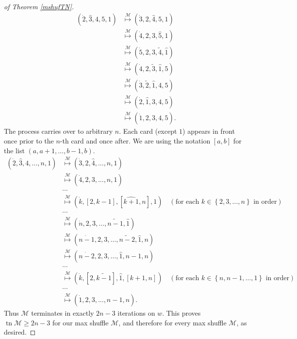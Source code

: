 \documentclass[final,nomarks]{dmtcs-episciences}
\theoremstyle{definition}
\theoremstyle{definition}
\theoremstyle{remark}
\newcommand{\M}{\mathcal{M}} %
\newcommand{\tn}{\operatorname{tn }} %
\newcommand{\tup}[1]{\left( #1 \right)}
\newcommand{\set}[1]{\left\{ #1 \right\}}
\begin{document}
\begin{proof}[of Theorem \ref{mshufTN}]
\begin{align*}
    \tup{\dot{2},\hat{3},4,5,1} &\overset{\M}{ \mapsto } \tup{\dot{3},2,\hat{4},5,1}\\
     &\overset{\M}{ \mapsto } \tup{\dot{4},2,3,\hat{5},1}\\
     &\overset{\M}{ \mapsto } \tup{\dot{5},2,3,\tilde{4},\hat{1}}\\
     &\overset{\M}{ \mapsto } \tup{\dot{4},2,\tilde{3},\hat{1},5}\\
     &\overset{\M}{ \mapsto } \tup{\dot{3},\tilde{2},\hat{1},4,5}\\
     &\overset{\M}{ \mapsto } \tup{\dot{2},\hat{1},3,4,5}\\
     &\overset{\M}{ \mapsto } \tup{\dot{1},2,3,4,5}.
\end{align*}
The process carries over to arbitrary $n$. Each card (except $1$) appears in front once prior to the $n$-th card and once after.
We are using the notation $[a,b]$ for the list $\tup{a,a+1,\ldots,b-1,b}$.
 \begin{align*}
        (\dot{2},\hat{3},4,\dots,n,1) &\overset{\M}{ \mapsto } (\dot{3},2,\hat{4},\dots,n,1)\\
                          &\overset{\M}{ \mapsto } (\dot{4},2,3,\dots,n,1)\\
                          & \cdots \\
                          &\overset{\M}{ \mapsto } (\dot{k},[2,k-1],[\hat{k+1},n],1) \quad\tup{\text{for each } k \in \set{2,3,\ldots,n} \text{ in order} }\\
                          & \cdots \\
                          &\overset{\M}{ \mapsto } (\dot{n},2,3,\dots,\tilde{n-1},\hat{1})\\
                          &\overset{\M}{ \mapsto } (\dot{n-1},2,3,\dots,\tilde{n-2},\hat{1},n)\\
                          &\overset{\M}{ \mapsto } (\dot{n-2},2,3,\dots,\hat{1},n-1,n)\\
                          & \cdots \\
                          &\overset{\M}{ \mapsto } (\dot{k},[2,\tilde{k-1}],\hat{1},[k+1,n]) \quad\tup{\text{for each } k \in \set{n,n-1,\ldots,1} \text{ in order}}\\
                          & \cdots \\
                          &\overset{\M}{ \mapsto } (\dot{1},2,3,\dots,n-1,n).
\end{align*}
Thus $\M$ terminates in exactly $2n-3$ iterations on $w$.
This proves $\tn \M \ge 2n-3$ for our max shuffle $\M$, and therefore for every max shuffle $\M$, as desired.
\end{proof}
\end{document}
